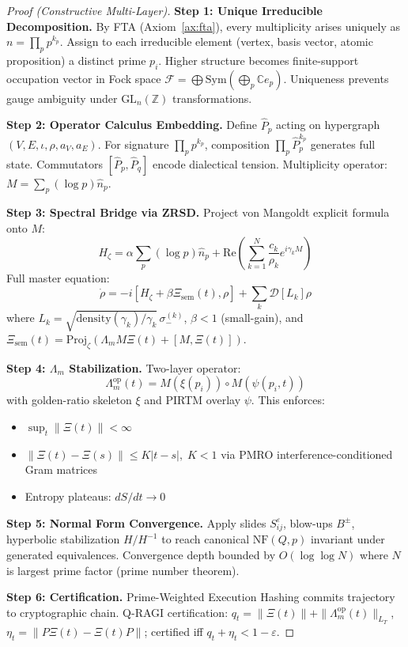 \documentclass[11pt,a4paper]{article}
\theoremstyle{plain}
\theoremstyle{definition}
\theoremstyle{remark}
\begin{document}
\begin{proof}[Proof (Constructive Multi-Layer)]
\textbf{Step 1: Unique Irreducible Decomposition.}
By FTA (Axiom~\ref{ax:fta}), every multiplicity arises uniquely as \(n = \prod_p p^{k_p}\). Assign to each irreducible element (vertex, basis vector, atomic proposition) a distinct prime \(p_i\). Higher structure becomes finite-support occupation vector in Fock space \(\mathcal{F} = \bigoplus \text{Sym}(\bigoplus_p \mathbb{C} e_p)\). Uniqueness prevents gauge ambiguity under \(\text{GL}_n(\mathbb{Z})\) transformations.

\textbf{Step 2: Operator Calculus Embedding.}
Define \(\hat{P}_p\) acting on hypergraph \((V,E,\iota,\rho,a_V,a_E)\). For signature \(\prod_p p^{k_p}\), composition \(\prod_p \hat{P}_p^{k_p}\) generates full state. Commutators \([\hat{P}_p, \hat{P}_q]\) encode dialectical tension. Multiplicity operator: \(M = \sum_p (\log p) \hat{n}_p\).

\textbf{Step 3: Spectral Bridge via ZRSD.}
Project von Mangoldt explicit formula onto \(M\):
\[
H_\zeta = \alpha \sum_p (\log p) \hat{n}_p + \text{Re}\left(\sum_{k=1}^N \frac{c_k}{\rho_k} e^{i\gamma_k M}\right)
\]
Full master equation:
\[
\dot{\rho} = -i[H_\zeta + \beta \Xi_{\text{sem}}(t), \rho] + \sum_k \mathcal{D}[L_k]\rho
\]
where \(L_k = \sqrt{\text{density}(\gamma_k)/\gamma_k} \,\sigma_-^{(k)}\), \(\beta < 1\) (small-gain), and \(\Xi_{\text{sem}}(t) = \text{Proj}_\zeta(\Lambda_m M \Xi(t) + [M, \Xi(t)])\).

\textbf{Step 4: \(\Lambda_m\) Stabilization.}
Two-layer operator:
\[
\Lambda_m^{\text{op}}(t) = M(\xi(p_i)) \circ M(\psi(p_i,t))
\]
with golden-ratio skeleton \(\xi\) and PIRTM overlay \(\psi\). This enforces:
\begin{itemize}[leftmargin=*]
\item \(\sup_t \|\Xi(t)\| < \infty\)
\item \(\|\Xi(t) - \Xi(s)\| \leq K|t-s|, \; K < 1\) via PMRO interference-conditioned Gram matrices
\item Entropy plateaus: \(dS/dt \to 0\)
\end{itemize}

\textbf{Step 5: Normal Form Convergence.}
Apply slides \(S_{ij}^\varepsilon\), blow-ups \(B^\pm\), hyperbolic stabilization \(H/H^{-1}\) to reach canonical \(\text{NF}(Q,p)\) invariant under generated equivalences. Convergence depth bounded by \(O(\log \log N)\) where \(N\) is largest prime factor (prime number theorem).

\textbf{Step 6: Certification.}
Prime-Weighted Execution Hashing commits trajectory to cryptographic chain. Q-RAGI certification: \(q_t = \|\Xi(t)\| + \|\Lambda_m^{\text{op}}(t)\|_{L_T}\), \(\eta_t = \|P\Xi(t) - \Xi(t)P\|\); certified iff \(q_t + \eta_t < 1 - \varepsilon\).
\end{proof}
\end{document}
